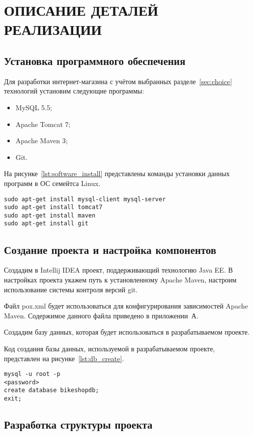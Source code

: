 \section[Описание деталей реализации]{ОПИСАНИЕ ДЕТАЛЕЙ РЕАЛИЗАЦИИ}

\subsection{Установка программного обеспечения}
\label{sub:realization_software_install}

Для разработки интернет-магазина с учётом выбранных разделе~\ref{sec:choice}
технологий установим следующие программы:

\begin{itemize}
    \item MySQL 5.5;
    \item Apache Tomcat 7;
    \item Apache Maven 3;
    \item Git.
\end{itemize}

На рисунке~\ref{lst:software_install} представлены команды установки данных
программ в ОС семейтса Linux.

\begin{lstlisting}[caption=Команды установки необходимого программного обеспечения,label=lst:software_install]
sudo apt-get install mysql-client mysql-server
sudo apt-get install tomcat7
sudo apt-get install maven
sudo apt-get install git
\end{lstlisting}

\subsection{Создание проекта и настройка компонентов}

Создадим в Intellij IDEA проект, поддерживающий технологию Java EE.
В настройках проекта укажем путь к установленному Apache Maven,
настроим использование системы контроля версий git.

Файл pox.xml будет использоваться для конфигурирования зависимостей Apache Maven.
Содержимое данного файла приведено в приложении~А.

Создадим базу данных, которая будет использоваться в разрабатываемом проекте.

\pagebreak

Код создания базы данных, используемой в разрабатываемом проекте,
представлен на рисунке~\ref{lst:db_create}.

\begin{lstlisting}[caption=Команды создания базы данных для проекта,label=lst:db_create]
mysql -u root -p
<password>
create database bikeshopdb;
exit;
\end{lstlisting}


\subsection{Разработка структуры проекта}


\pagebreak
